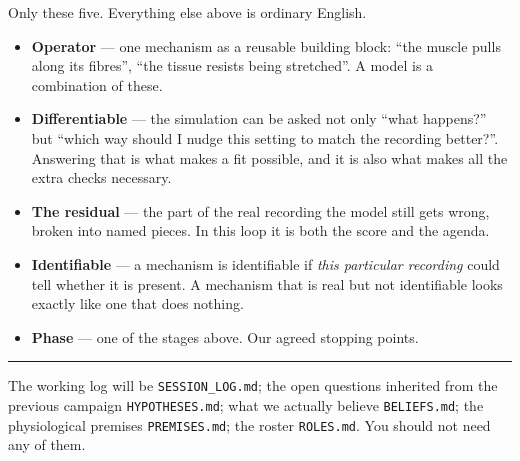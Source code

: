 \documentclass[11pt,a4paper]{article}
\begin{document}
Only these five. Everything else above is ordinary English.

\begin{itemize}
\item \textbf{Operator} --- one mechanism as a reusable building block: ``the muscle pulls along its
fibres'', ``the tissue resists being stretched''. A model is a combination of these.
\item \textbf{Differentiable} --- the simulation can be asked not only ``what happens?'' but ``which
way should I nudge this setting to match the recording better?''. Answering that is what makes a fit
possible, and it is also what makes all the extra checks necessary.
\item \textbf{The residual} --- the part of the real recording the model still gets wrong, broken
into named pieces. In this loop it is both the score and the agenda.
\item \textbf{Identifiable} --- a mechanism is identifiable if \emph{this particular recording} could
tell whether it is present. A mechanism that is real but not identifiable looks exactly like one that
does nothing.
\item \textbf{Phase} --- one of the stages above. Our agreed stopping points.
\end{itemize}

\vspace{6pt}
\hrule
\vspace{6pt}
{\small\color{grey}
The working log will be \texttt{SESSION\_LOG.md}; the open questions inherited from the previous
campaign \texttt{HYPOTHESES.md}; what we actually believe \texttt{BELIEFS.md}; the physiological
premises \texttt{PREMISES.md}; the roster \texttt{ROLES.md}. You should not need any of them.}
\end{document}
